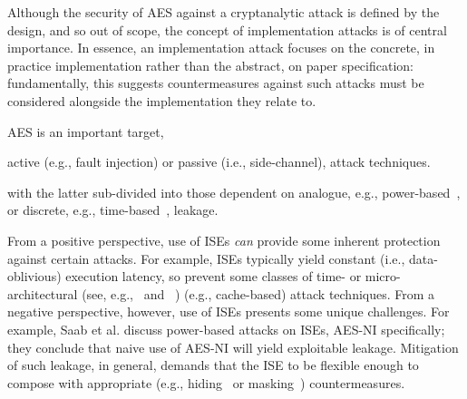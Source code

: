 

Although the security of AES against a cryptanalytic attack is defined by
the design, and so out of scope, the concept of implementation attacks is
of central importance.
In essence, an implementation attack focuses on
the concrete, in practice implementation
rather than
the abstract, on paper     specification:
fundamentally, this suggests countermeasures against such attacks must be
considered alongside the implementation they relate to.

AES is an important target, 

 active (e.g., fault injection)
or
passive (i.e., side-channel),
attack techniques.

with the latter sub-divided into those dependent on
analogue,
e.g., power-based~\cite{},
or
discrete, 
e.g.,  time-based~\cite{KoeQui:99},
leakage.

From a positive perspective, use of ISEs
{\em can} provide some inherent protection against certain attacks.
For example,
ISEs typically yield constant (i.e., data-oblivious) execution latency,
so prevent some classes of time- or micro-architectural
(see, e.g.,~\cite[Section 4]{Szefer:19} and ~\cite[Section 4]{GYCH:18})
(e.g., cache-based) attack techniques.
From a negative perspective, however,
use of ISEs presents some unique challenges.
For example, 
Saab et al.\cite{SaaRohHam:16}
discuss power-based attacks on ISEs, AES-NI specifically; they conclude
that naive use of AES-NI will yield exploitable leakage.  Mitigation of
such leakage, in general, demands that the ISE to be flexible enough to
compose with appropriate
(e.g., hiding~\cite[Chapter 7]{dpabook} or masking~\cite[Chapter 10]{dpabook})
countermeasures.


